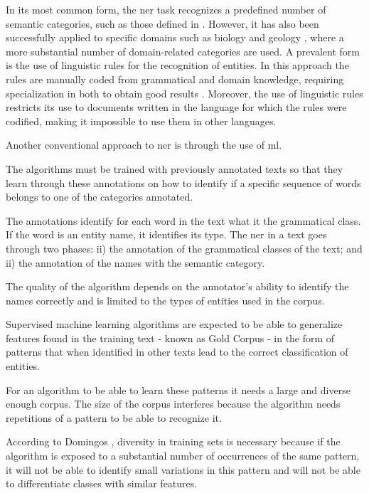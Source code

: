 In its most common form, the \gls{ner} task recognizes a predefined number of semantic categories, such as those defined in \cite{grishman1996message}. However, it has also been successfully applied to specific domains such as biology \cite{campos2012biomedical} and geology \cite{sobhana2010conditional}, where a more substantial number of domain-related categories are used. A prevalent form is the use of linguistic rules for the recognition of entities. In this approach the rules are manually coded from grammatical and domain knowledge, requiring specialization in both to obtain good results \cite{nadeau2007survey}. Moreover, the use of linguistic rules restricts its use to documents written in the language for which the rules were codified, making it impossible to use them in other languages.

Another conventional approach to \gls{ner} is through the use of \gls{ml}.

The algorithms must be trained with previously annotated texts so that they learn through these annotations on how to identify if a specific sequence of words belongs to one of the categories annotated. 

The annotations identify for each word in the text what it the grammatical class. If the word is an entity name, it identifies its type. The \gls{ner} in a text goes through two phases: ii) the annotation of the grammatical classes of the text; and ii) the annotation of the names with the semantic category.

The quality of the algorithm depends on the annotator's ability to identify the names correctly and is limited to the types of entities used in the corpus. 

Supervised machine learning algorithms are expected to be able to generalize features found in the training text - known as Gold Corpus - in the form of patterns that when identified in other texts lead to the correct classification of entities. 

For an algorithm to be able to learn these patterns it needs a large and diverse enough corpus. The size of the corpus interferes because the algorithm needs repetitions of a pattern to be able to recognize it. 

According to Domingos \cite{domingos2012few}, diversity in training sets is necessary because if the algorithm is exposed to a substantial number of occurrences of the same pattern, it will not be able to identify small variations in this pattern and will not be able to differentiate classes with similar features.

